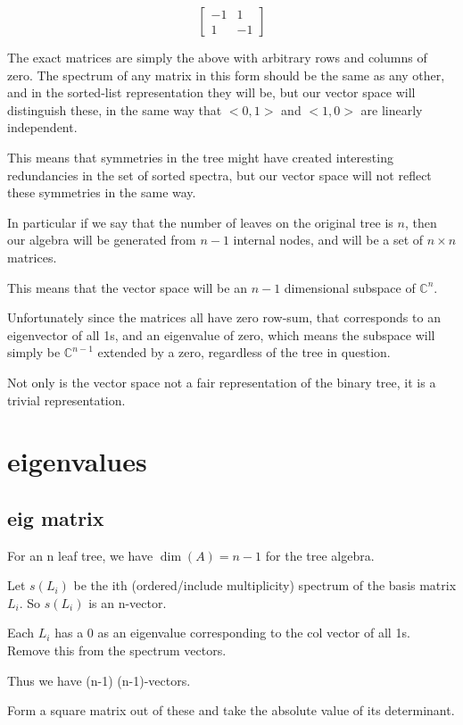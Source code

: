 \documentclass{report}
\begin{document}
\[
	\left[ \begin{matrix}
		-1 & 1\\
		1 & -1
	\end{matrix} \right]
\]

The exact matrices are simply the above with arbitrary rows and columns of
zero.
The spectrum of any matrix in this form should be the same as any other, and in
the sorted-list representation they will be, but our vector space will
distinguish these, in the same way that $<0, 1>$ and $<1, 0>$ are linearly
independent.

This means that symmetries in the tree might have created interesting
redundancies in the set of sorted spectra, but our vector space will not
reflect these symmetries in the same way.

In particular if we say that the number of leaves on the original tree is $n$,
then our algebra will be generated from $n-1$ internal nodes, and will be a set
of $n \times n$ matrices.

This means that the vector space will be an $n-1$ dimensional subspace of
$\mathds{C}^n$.

Unfortunately since the matrices all have zero row-sum, that corresponds to an
eigenvector of all 1s, and an eigenvalue of zero, which means the subspace will
simply be $\mathds{C}^{n-1}$ extended by a zero, regardless of the tree in
question.

Not only is the vector space not a fair representation of the binary tree, it
is a trivial representation.

\section{eigenvalues}

\subsection{eig matrix}

For an n leaf tree, we have $\dim(A)=n-1$ for the tree algebra.

Let $s(L_i)$ be the ith (ordered/include multiplicity) spectrum of the basis
matrix $L_i$. So $s(L_i)$ is an n-vector.

Each $L_i$ has a 0 as an eigenvalue corresponding to the col vector of all 1s.
Remove this from the spectrum vectors.

Thus we have (n-1) (n-1)-vectors.

Form a square matrix out of these and take the absolute value of its
determinant.
\end{document}
